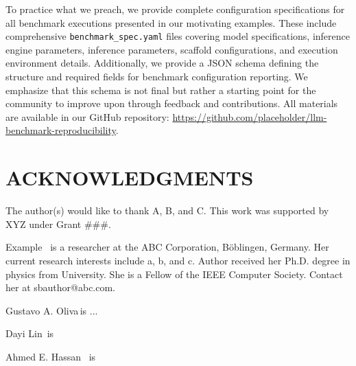 \documentclass{IEEEcsmag}
\begin{document}
To practice what we preach, we provide complete configuration specifications for all benchmark executions presented in our motivating examples. These include comprehensive \texttt{benchmark\_spec.yaml} files covering model specifications, inference engine parameters, inference parameters, scaffold configurations, and execution environment details. Additionally, we provide a JSON schema defining the structure and required fields for benchmark configuration reporting. We emphasize that this schema is not final but rather a starting point for the community to improve upon through feedback and contributions. All materials are available in our GitHub repository: \url{https://github.com/placeholder/llm-benchmark-reproducibility}.

\section{ACKNOWLEDGMENTS}
The author(s) would like to thank A, B, and C. This work was supported by XYZ under Grant \#\#\#.

\def\refname{REFERENCES}





\begin{IEEEbiography}{Example} {\,} is a researcher at the  ABC Corporation, B\"oblingen, Germany.  Her current research interests include a, b, and c. Author received her Ph.D. degree  in physics from University. She is a Fellow of the IEEE Computer Society. Contact her at sbauthor@abc.com.
\end{IEEEbiography}

\begin{IEEEbiography}{Gustavo A. Oliva}{\,}is ...
\end{IEEEbiography}

\begin{IEEEbiography}{Dayi Lin}{\,} is 
\end{IEEEbiography}

\begin{IEEEbiography}{Ahmed E. Hassan} {\,} is 
\end{IEEEbiography}
\end{document}
